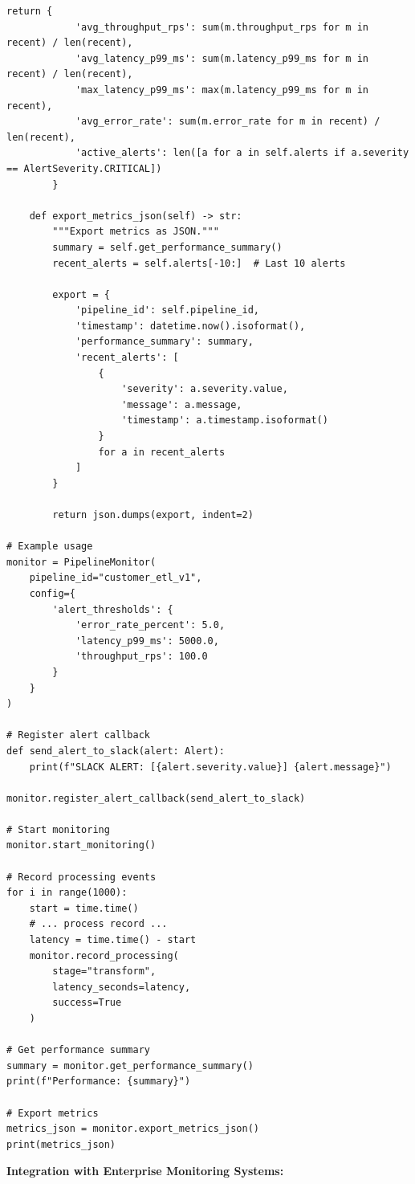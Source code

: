 \begin{lstlisting}[style=python, caption=PipelineMonitor with Performance Tracking]
        return {
            'avg_throughput_rps': sum(m.throughput_rps for m in recent) / len(recent),
            'avg_latency_p99_ms': sum(m.latency_p99_ms for m in recent) / len(recent),
            'max_latency_p99_ms': max(m.latency_p99_ms for m in recent),
            'avg_error_rate': sum(m.error_rate for m in recent) / len(recent),
            'active_alerts': len([a for a in self.alerts if a.severity == AlertSeverity.CRITICAL])
        }

    def export_metrics_json(self) -> str:
        """Export metrics as JSON."""
        summary = self.get_performance_summary()
        recent_alerts = self.alerts[-10:]  # Last 10 alerts

        export = {
            'pipeline_id': self.pipeline_id,
            'timestamp': datetime.now().isoformat(),
            'performance_summary': summary,
            'recent_alerts': [
                {
                    'severity': a.severity.value,
                    'message': a.message,
                    'timestamp': a.timestamp.isoformat()
                }
                for a in recent_alerts
            ]
        }

        return json.dumps(export, indent=2)

# Example usage
monitor = PipelineMonitor(
    pipeline_id="customer_etl_v1",
    config={
        'alert_thresholds': {
            'error_rate_percent': 5.0,
            'latency_p99_ms': 5000.0,
            'throughput_rps': 100.0
        }
    }
)

# Register alert callback
def send_alert_to_slack(alert: Alert):
    print(f"SLACK ALERT: [{alert.severity.value}] {alert.message}")

monitor.register_alert_callback(send_alert_to_slack)

# Start monitoring
monitor.start_monitoring()

# Record processing events
for i in range(1000):
    start = time.time()
    # ... process record ...
    latency = time.time() - start
    monitor.record_processing(
        stage="transform",
        latency_seconds=latency,
        success=True
    )

# Get performance summary
summary = monitor.get_performance_summary()
print(f"Performance: {summary}")

# Export metrics
metrics_json = monitor.export_metrics_json()
print(metrics_json)
\end{lstlisting}

\textbf{Integration with Enterprise Monitoring Systems:}

